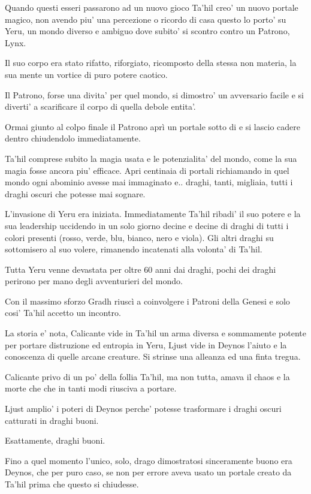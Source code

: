 \documentclass[a4paper,11pt,twoside,openany]{book}
\begin{document}
Quando questi esseri passarono ad un nuovo gioco Ta'hil creo' un nuovo portale magico, non avendo piu' una percezione o ricordo di casa questo lo porto' su Yeru, un mondo diverso e ambiguo dove subito' si scontro contro un Patrono, Lynx.

Il suo corpo era stato rifatto, riforgiato, ricomposto della stessa non materia, la sua mente un vortice di puro potere caotico.

Il Patrono, forse una divita' per quel mondo, si dimostro' un avversario facile e si diverti' a scarificare il corpo di quella debole entita'.

Ormai giunto al colpo finale il Patrono aprì un portale sotto di e si lascio cadere dentro chiudendolo immediatamente.

Ta'hil comprese subito la magia usata e le potenzialita' del mondo, come la sua magia fosse ancora piu' efficace.
Apri centinaia di portali richiamando in quel mondo ogni abominio avesse mai immaginato e.. draghi, tanti, migliaia, tutti i draghi oscuri che potesse mai sognare.

L'invasione di Yeru era iniziata. Immediatamente Ta'hil ribadi' il suo potere e la sua leadership uccidendo in un solo giorno decine e decine di draghi di tutti i colori presenti (rosso, verde, blu, bianco, nero e viola).
Gli altri draghi su sottomisero al suo volere, rimanendo incatenati alla volonta' di Ta'hil.

Tutta Yeru venne devastata per oltre 60 anni dai draghi, pochi dei draghi perirono per mano degli avventurieri del mondo.

Con il massimo sforzo Gradh riuscì a coinvolgere i Patroni della Genesi e solo cosi' Ta'hil accetto un incontro.

La storia e' nota, Calicante vide in Ta'hil un arma diversa e sommamente potente per portare distruzione ed entropia in Yeru, Ljust vide in Deynos l'aiuto e la conoscenza di quelle arcane creature.
Si strinse una alleanza ed una finta tregua.

Calicante privo di un po' della follia Ta'hil, ma non tutta, amava il chaos e la morte che che in tanti modi riusciva a portare.

Ljust amplio' i poteri di Deynos perche' potesse trasformare i draghi oscuri catturati in draghi buoni.

Esattamente, draghi buoni.

Fino a quel momento l'unico, solo, drago dimostratosi sinceramente buono era Deynos, che per puro caso, se non per errore aveva usato un portale creato da Ta'hil prima che questo si chiudesse.
\end{document}
